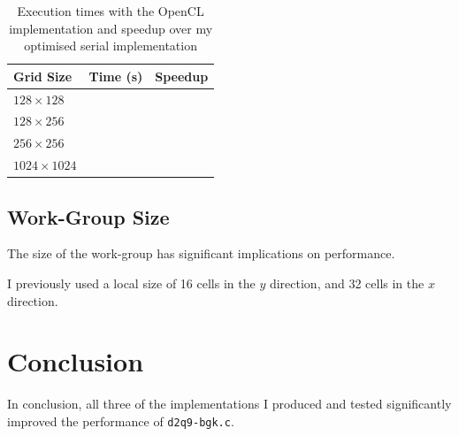 \documentclass[twocolumn, a4paper]{article}
\begin{document}
\begin{table}[htbp]
  \begin{center}
  \caption{Execution times with the OpenCL implementation and speedup over my optimised serial implementation}\label{tab:OpenCL}
  \begin{tabular}[t]{l | l l} 
      \hline\hline
      Grid Size&Time (s)&Speedup\\
      \hline
      $128 \times 128$&\texttt{}&\texttt{}\\
      $128 \times 256$&\texttt{}&\texttt{}\\
      $256 \times 256$&\texttt{}&\texttt{}\\
      $1024 \times 1024$&\texttt{}&\texttt{}\\
      \hline
    \end{tabular}
  \end{center}
\end{table}

\subsection{Work-Group Size}

The size of the work-group has significant implications on performance.


I previously used a local size of 16 cells in the $y$ direction, and 32 cells in the $x$ direction.


\section{Conclusion}

In conclusion, all three of the implementations I produced and tested significantly improved the performance of \texttt{d2q9-bgk.c}.

\printbibliography
\end{document}
